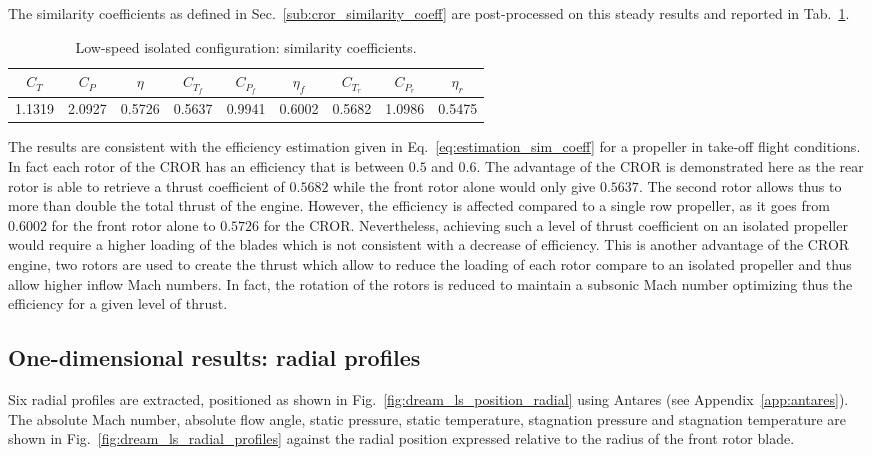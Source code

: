 The similarity coefficients as defined in 
Sec.~\ref{sub:cror_similarity_coeff} are post-processed on
this steady results and reported in Tab.~\ref{tab:dream_ls_sim_coeff}.
\begin{table}[htp]
   \centering
  \begin{tabular}{ccc|cccccc}
    \toprule
    $C_T$ & $C_P$ & $\eta$ & $C_{T_f}$ & $C_{P_f}$ & $\eta_f$ & $C_{T_r}$ & $C_{P_r}$ & $\eta_r$ \\
    \midrule
    1.1319 & 2.0927 & 0.5726 & 0.5637 & 0.9941 &  0.6002 & 0.5682 & 1.0986 &  0.5475 \\
    \bottomrule
  \end{tabular}
  \caption{Low-speed isolated configuration: similarity coefficients.}
  \label{tab:dream_ls_sim_coeff}
\end{table}
The results are consistent with the efficiency estimation given in 
Eq.~\eqref{eq:estimation_sim_coeff} for a propeller in take-off flight conditions.
In fact each rotor of the CROR has an efficiency that is between $0.5$
and $0.6$. The advantage of the CROR is demonstrated here as the rear
rotor is able to retrieve a thrust coefficient of $0.5682$ while
the front rotor alone would only give $0.5637$.
The second rotor allows thus to more than double the total thrust of the engine.
However, the efficiency is affected compared to a single row 
propeller, as
it goes from $0.6002$ for the front rotor alone to $0.5726$ for the CROR.
Nevertheless, achieving such a level of thrust coefficient on an isolated
propeller would require a higher loading of the blades which is not
consistent with a decrease of efficiency.
This is another advantage 
of the CROR engine, two rotors are used to create the thrust which allow to
reduce the loading of each rotor compare to an isolated propeller and thus
allow higher inflow Mach numbers. In fact, the rotation of the rotors is reduced 
to maintain a subsonic Mach number optimizing thus the efficiency
for a given level of thrust.


\subsection{One-dimensional results: radial profiles}
\label{sub:dream_ls_radial_profiles}

Six radial profiles are extracted,
positioned as shown in Fig.~\ref{fig:dream_ls_position_radial}
using Antares (see Appendix~\ref{app:antares}). The absolute
Mach number, absolute flow angle, static pressure, static
temperature, stagnation pressure and stagnation temperature
are shown in Fig.~\ref{fig:dream_ls_radial_profiles}
against the radial position expressed
relative to the radius of the front rotor blade.

